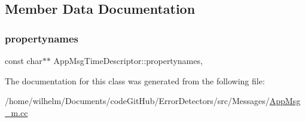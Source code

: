 \subsection{Member Data Documentation}
\mbox{\label{class_app_msg_time_descriptor_a102cbf09a1ba7e40df81cca8c3c503b4}} 
\subsubsection{\texorpdfstring{propertynames}{propertynames}}
{\footnotesize\ttfamily const char$\ast$$\ast$ App\+Msg\+Time\+Descriptor\+::propertynames\hspace{0.3cm}{\ttfamily [mutable]}, {\ttfamily [private]}}



The documentation for this class was generated from the following file\+:\begin{DoxyCompactItemize}
\item 
/home/wilhelm/\+Documents/code\+Git\+Hub/\+Error\+Detectors/src/\+Messages/\hyperlink{_app_msg__m_8cc}{App\+Msg\+\_\+m.\+cc}\end{DoxyCompactItemize}

